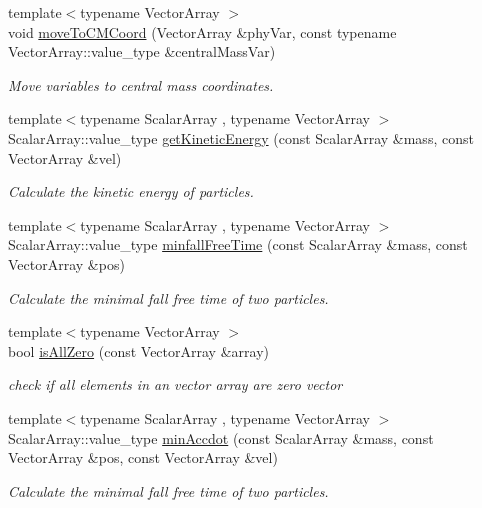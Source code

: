 \begin{DoxyCompactItemize}
{\footnotesize template$<$typename Vector\+Array $>$ }\\void \mbox{\hyperlink{namespace_space_h_afb4e29bf684f5b98b6022db70cab0321}{move\+To\+C\+M\+Coord}} (Vector\+Array \&phy\+Var, const typename Vector\+Array\+::value\+\_\+type \&central\+Mass\+Var)
\begin{DoxyCompactList}\small\item\em Move variables to central mass coordinates. \end{DoxyCompactList}\item 
{\footnotesize template$<$typename Scalar\+Array , typename Vector\+Array $>$ }\\Scalar\+Array\+::value\+\_\+type \mbox{\hyperlink{namespace_space_h_a18a2979505e69ee2cf1806f782ed436e}{get\+Kinetic\+Energy}} (const Scalar\+Array \&mass, const Vector\+Array \&vel)
\begin{DoxyCompactList}\small\item\em Calculate the kinetic energy of particles. \end{DoxyCompactList}\item 
{\footnotesize template$<$typename Scalar\+Array , typename Vector\+Array $>$ }\\Scalar\+Array\+::value\+\_\+type \mbox{\hyperlink{namespace_space_h_a604d09de4efdae2ecc200f2c7c68597a}{minfall\+Free\+Time}} (const Scalar\+Array \&mass, const Vector\+Array \&pos)
\begin{DoxyCompactList}\small\item\em Calculate the minimal fall free time of two particles. \end{DoxyCompactList}\item 
{\footnotesize template$<$typename Vector\+Array $>$ }\\bool \mbox{\hyperlink{namespace_space_h_a80839ad6ba6215623aa6a4ad4fc99c36}{is\+All\+Zero}} (const Vector\+Array \&array)
\begin{DoxyCompactList}\small\item\em check if all elements in an vector array are zero vector \end{DoxyCompactList}\item 
{\footnotesize template$<$typename Scalar\+Array , typename Vector\+Array $>$ }\\Scalar\+Array\+::value\+\_\+type \mbox{\hyperlink{namespace_space_h_aba7eeef1dd99d282a7653b187f2b9f9f}{min\+Accdot}} (const Scalar\+Array \&mass, const Vector\+Array \&pos, const Vector\+Array \&vel)
\begin{DoxyCompactList}\small\item\em Calculate the minimal fall free time of two particles. \end{DoxyCompactList}\item 

\end{DoxyCompactItemize}
